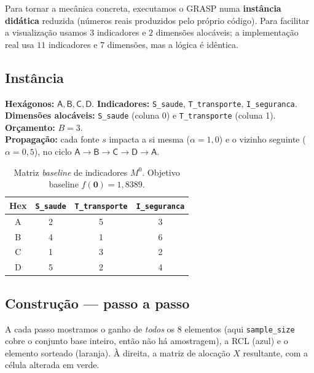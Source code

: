 \documentclass[11pt,a4paper]{article}
\newcommand{\hex}[1]{\textsf{#1}}
\begin{document}
Para tornar a mecânica concreta, executamos o GRASP numa \textbf{instância
didática} reduzida (números reais produzidos pelo próprio código). Para facilitar
a visualização usamos $3$ indicadores e $2$ dimensões alocáveis; a implementação
real usa $11$ indicadores e $7$ dimensões, mas a lógica é idêntica.

\subsection{Instância}

\textbf{Hexágonos:} $\hex{A},\hex{B},\hex{C},\hex{D}$. \quad
\textbf{Indicadores:} \texttt{S\_saude}, \texttt{T\_transporte}, \texttt{I\_seguranca}.\\
\textbf{Dimensões alocáveis:} \texttt{S\_saude} (coluna 0) e
\texttt{T\_transporte} (coluna 1). \quad \textbf{Orçamento:} $B=3$.\\
\textbf{Propagação:} cada fonte $s$ impacta a si mesma ($\alpha=1{,}0$) e o
vizinho seguinte ($\alpha=0{,}5$), no ciclo
$\hex{A}\!\to\!\hex{B}\!\to\!\hex{C}\!\to\!\hex{D}\!\to\!\hex{A}$.

\begin{table}[ht]
\centering
\caption{Matriz \emph{baseline} de indicadores $M^0$. Objetivo baseline
$f(\mathbf 0)=1{,}8389$.}
\label{tab:baseline}
\begin{tabular}{@{}c ccc@{}}
\toprule
Hex & \texttt{S\_saude} & \texttt{T\_transporte} & \texttt{I\_seguranca} \\
\midrule
\hex{A} & 2 & 5 & 3 \\
\hex{B} & 4 & 1 & 6 \\
\hex{C} & 1 & 3 & 2 \\
\hex{D} & 5 & 2 & 4 \\
\bottomrule
\end{tabular}
\end{table}

\subsection{Construção --- passo a passo}

A cada passo mostramos o ganho de \emph{todos} os 8 elementos (aqui
\texttt{sample\_size} cobre o conjunto base inteiro, então não há amostragem),
a RCL (\colorbox{cellrcl}{azul}) e o elemento sorteado
(\colorbox{cellsel}{laranja}). À direita, a matriz de alocação $X$ resultante,
com a célula alterada em \colorbox{cellchg}{verde}.

\end{document}
